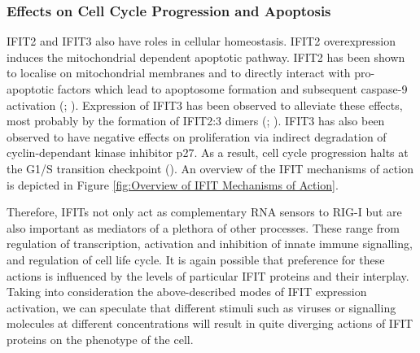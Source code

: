 \subsubsection{Effects on Cell Cycle Progression and Apoptosis} \label{Effects on Cell Cycle Progression and Apoptosis}
IFIT2 and IFIT3 also have roles in cellular homeostasis. IFIT2 overexpression induces the mitochondrial dependent apoptotic pathway. IFIT2 has been shown to localise on mitochondrial membranes and to directly interact with pro-apoptotic factors which lead to apoptosome formation and subsequent caspase-9 activation (\cite{Chen2017InhibitionApoptosis}; \cite{Diamond2013TheProteins}). Expression of IFIT3 has been observed to alleviate these effects, most probably by the formation of IFIT2:3 dimers (\cite{Mears2018BetterResponse}; \cite{Stawowczyk2011TheApoptosis}). IFIT3 has also been observed to have negative effects on proliferation via indirect degradation of cyclin-dependant kinase inhibitor p27. As a result, cell cycle progression halts at the G1/S transition checkpoint (\cite{Xiao2006RIG-GProteins}). An overview of the IFIT mechanisms of action is depicted in Figure \ref{fig:Overview of IFIT Mechanisms of Action}.

Therefore, IFITs not only act as complementary RNA sensors to RIG-I but are also important as mediators of a plethora of other processes. These range from regulation of transcription, activation and inhibition of innate immune signalling, and regulation of cell life cycle. It is again possible that preference for these actions is influenced by the levels of particular IFIT proteins and their interplay. Taking into consideration the above-described modes of IFIT expression activation, we can speculate that different stimuli such as viruses or signalling molecules at different concentrations will result in quite diverging actions of IFIT proteins on the phenotype of the cell.

